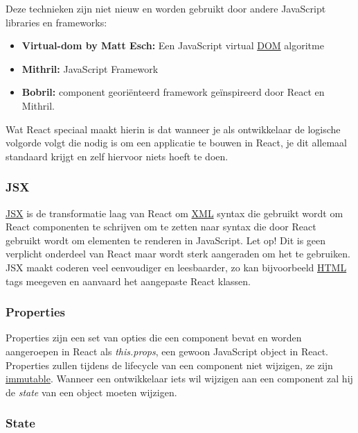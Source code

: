 		Deze technieken zijn niet nieuw en worden gebruikt door andere JavaScript libraries en frameworks:
		
		\begin{itemize}
			\item \textbf{Virtual-dom by Matt Esch:} Een JavaScript virtual \hyperref[dom]{DOM} algoritme
			\item \textbf{Mithril:} JavaScript Framework
			\item \textbf{Bobril:} component georiënteerd framework geïnspireerd door React en Mithril.
		\end{itemize}
		
		Wat React speciaal maakt hierin is dat wanneer je als ontwikkelaar de logische volgorde volgt die nodig is om een applicatie te bouwen in React, je dit allemaal standaard krijgt en zelf hiervoor niets hoeft te doen.
	
	\subsubsection{JSX}
		
		\hyperref[jsx]{JSX} is de transformatie laag van React om \hyperref[xml]{XML} syntax die gebruikt wordt om React componenten te schrijven om te zetten naar syntax die door React gebruikt wordt om elementen te renderen in JavaScript. Let op! Dit is geen verplicht onderdeel van React maar wordt sterk aangeraden om het te gebruiken. JSX maakt coderen veel eenvoudiger en leesbaarder, zo kan bijvoorbeeld \hyperref[html]{HTML} tags meegeven en aanvaard het aangepaste React klassen.
		
	
	\subsubsection{Properties}
		
		Properties zijn een set van opties die een component bevat en worden aangeroepen in React als \emph{this.props}, een gewoon JavaScript object in React. Properties zullen tijdens de lifecycle van een component niet wijzigen, ze zijn \hyperref[immutable]{immutable}. Wanneer een ontwikkelaar iets wil wijzigen aan een component zal hij de \emph{state} van een object moeten wijzigen.
	
	\subsubsection{State}
		
